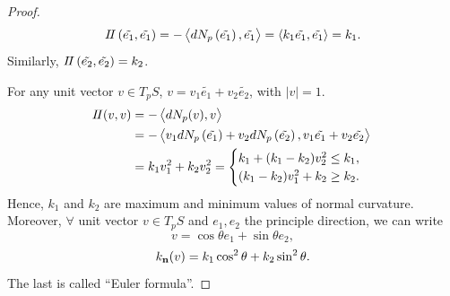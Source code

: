 \begin{proof}
    \[
    I\!I\left(\tilde{e_1},\tilde{e_1}\right)=-\left\langle
        d N_p\left(\tilde{e_1}\right),\tilde{e_1}\right\rangle
        =\left\langle k_1 \tilde{e_1},\tilde{e_1}\right\rangle
        =k_1.
    \]
    Similarly, \(I\!I\left(\tilde{e_2},\tilde{e_2}\right)=k_2\).

    For any unit vector \(v\in T_p S\), \(v=
    v_1\tilde{e_1}+v_2\tilde{e_2}\), with \(|v|=1\).
    \begin{align*}
        I\!I(v,v)&=-\left\langle dN_p(v),v\right\rangle\\
        &=-\left\langle v_1 d N_p\left(\tilde{e_1}\right)
        +v_2dN_p\left(\tilde{e_2}\right),v_1\tilde{e_1}+v_2
        \tilde{e_2}\right\rangle\\
        &=k_1 v_1^2 +k_2 v_2^2=
        \begin{cases}
            k_1+(k_1-k_2)v_2^2\le k_1,\\
            (k_1-k_2)v_1^2+k_2\ge k_2.
        \end{cases}
    \end{align*}
    Hence, \(k_1\) and \(k_2\) are maximum and minimum values of normal
    curvature. Moreover, \(\forall\) unit vector \(v\in T_p S\) and 
    {\(e_1,e_2\)} the principle direction, we can write
    \[
        v=\cos \theta e_1+\sin\theta e_2,
    \]
    \[
        k_{\vb{n}}(v)=k_1 \cos^2\theta +k_2 \sin^2\theta.    
    \]
    The last is called ``Euler formula''.
\end{proof}
